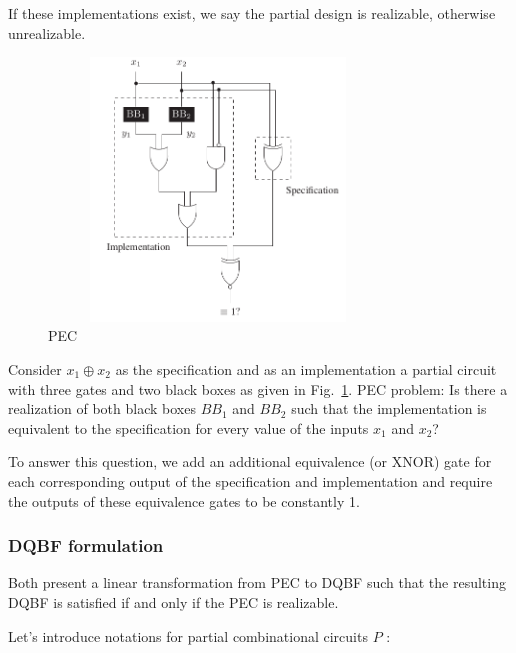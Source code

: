 \documentclass[runningheads]{llncs}
\begin{document}
If these implementations exist, we say the partial design is realizable, otherwise unrealizable.

\begin{figure}[]
	\includegraphics[width=9cm, height=7cm]{pec}
	\centering
	\caption{PEC}\label{fig:pec}
\end{figure}

\begin{example} \label{eg:dqbf}
Consider $x_1 \oplus x_2$ as the specification and as an
implementation a partial circuit with three gates and two black boxes as given in Fig.~\ref{fig:pec}.
PEC problem: Is there a realization of both black boxes $BB_1$ and $BB_2$ such that the implementation is equivalent to the specification for every value of the inputs $x_1$ and $x_2$?

To answer this question, we add an additional equivalence (or XNOR) gate for each corresponding output of the specification and implementation and require the outputs of these equivalence gates to be constantly 1.
\end{example}

\subsubsection{DQBF formulation}\label{sssec:dqbf-fml}
Both \cite{gitinarswb13, gitinarswb13r} present a linear transformation from PEC to DQBF such that the resulting DQBF is satisfied if and only if the PEC is realizable.

Let's introduce notations for partial combinational circuits $P$ :
\end{document}
